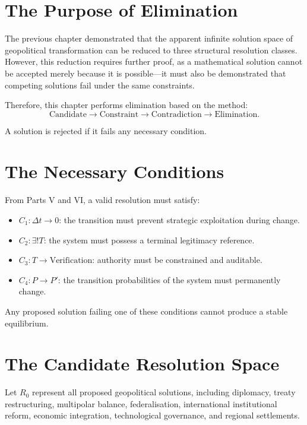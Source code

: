 \documentclass[11pt,openany]{book}
\theoremstyle{plain}
\theoremstyle{definition}
\begin{document}
\section*{The Purpose of Elimination}

The previous chapter demonstrated that the apparent infinite solution space of geopolitical transformation can be reduced to three structural resolution classes. However, this reduction requires further proof, as a mathematical solution cannot be accepted merely because it is possible—it must also be demonstrated that competing solutions fail under the same constraints.

Therefore, this chapter performs elimination based on the method:
\[
\text{Candidate} \longrightarrow \text{Constraint} \longrightarrow \text{Contradiction} \longrightarrow \text{Elimination}.
\]

A solution is rejected if it fails any necessary condition.

\section*{The Necessary Conditions}

From Parts V and VI, a valid resolution must satisfy:
\begin{itemize}
\item \(C_1: \Delta t \to 0\): the transition must prevent strategic exploitation during change.
\item \(C_2: \exists ! T\): the system must possess a terminal legitimacy reference.
\item \(C_3: T \to \text{Verification}\): authority must be constrained and auditable.
\item \(C_4: P \to P'\): the transition probabilities of the system must permanently change.
\end{itemize}

Any proposed solution failing one of these conditions cannot produce a stable equilibrium.

\section*{The Candidate Resolution Space}

Let \(R_0\) represent all proposed geopolitical solutions, including diplomacy, treaty restructuring, multipolar balance, federalisation, international institutional reform, economic integration, technological governance, and regional settlements. 
\end{document}
